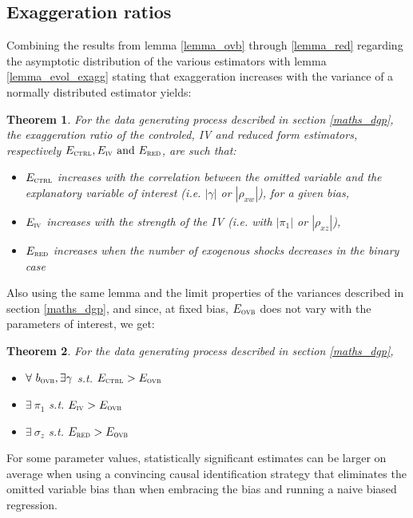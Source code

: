 \documentclass[usletter, 12pt]{article}
\newtheorem{theorem}{Theorem}
\begin{document}
		\subsection{Exaggeration ratios}
		
			Combining the results from lemma \ref{lemma_ovb} through \ref{lemma_red}  regarding the asymptotic distribution of the various estimators with lemma \ref{lemma_evol_exagg} stating that exaggeration increases with the variance of a normally distributed estimator yields:
			~
			\begin{theorem}
				For the data generating process described in section \ref{maths_dgp}, the exaggeration ratio of the controled, IV and reduced form estimators, respectively $E_{\textsc{ctrl}}, E_{\textsc{iv}} \text{ and } E_{\textsc{red}}$, are such that:
					\begin{itemize}
						\item $E_{\textsc{ctrl}}$ increases with the correlation between the omitted variable and the explanatory variable of interest (\textit{i.e.} $|\gamma|$ or $|\rho_{xw}|$), for a given bias,
						\item $E_{\textsc{iv}}$ increases with the strength of the IV (\textit{i.e.} with $|\pi_{1}|$ or $|\rho_{xz}|$),
						\item $E_{\textsc{red}}$ increases when the number of exogenous shocks decreases in the binary case
					\end{itemize}
			\end{theorem}
			
			Also using the same lemma and the limit properties of the variances described in section \ref{maths_dgp}, and since, at fixed bias, $E_{\textsc{ovb}}$ does not vary with the parameters of interest, we get:
			~
			\begin{theorem}
				For the data generating process described in section \ref{maths_dgp}, 
					\begin{itemize}
						\item $\forall \ b_{\textsc{ovb}}, \exists \gamma$ s.t. $E_{\textsc{ctrl}} > E_{\textsc{ovb}}$
						\item $\exists \ \pi_{1}$ s.t. $E_{\textsc{iv}} > E_{\textsc{ovb}}$
						\item $\exists \ \sigma_{z}$ s.t. $E_{\textsc{red}} > E_{\textsc{ovb}}$
					\end{itemize}
			\end{theorem}
			
			For some parameter values, statistically significant estimates can be larger on average when using a convincing causal identification strategy that eliminates the omitted variable bias than when embracing the bias and running a naive biased regression.	
	
\end{document}
